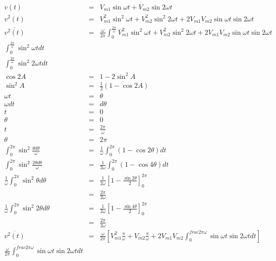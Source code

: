 \documentclass[a4paper,12pt]{article}
\begin{document}
\begin{eqnarray*}
v(t)						& = & V_{m1} \sin{\omega t} + V_{m2} \sin{2 \omega t} \\
v^{2}(t)					& = & V^{2}_{m1} \sin^{2}{\omega t} + V^{2}_{m2} \sin^{2}{2 \omega t} + 2V_{m1}V_{m2} \sin{\omega t}\sin{2 \omega t} \\
\overline{v^{2}(t)}	& = & \frac{\omega}{2 \pi} \int^{\frac{2 \pi}{\omega}}_{0} V^{2}_{m1} \sin^{2}{\omega t} + V^{2}_{m2} \sin^{2}{2\omega t} + 2V_{m1} V_{m2} \sin{\omega t}\sin{2 \omega t} \\
\int^{\frac{2 \pi}{\omega}}_{0} \sin^{2}{\omega t} dt & & \\
\int^{\frac{2 \pi}{\omega}}_{0} \sin^{2}{2 \omega t} dt & & \\
\cos{2A}					& = & 1 - 2 \sin^{2}{A} \\
\sin^{2}{A}				& = & \frac{1}{2} \left( 1 - \cos{2A} \right) \\
\omega t					& = & \theta \\
\omega dt				& = & d \theta \\
t							& = & 0 \\
\theta					& = & 0 \\
t							& = & \frac{2 \pi}{\omega} \\
\theta					& = & 2 \pi \\
\int^{2 \pi}_{0} \sin^{2}{\frac{\theta d \theta}{\omega}} & = & \frac{1}{\omega} \int^{2 \pi}_{0} (1 - \cos{2 \theta}) dt \\ 
\int^{2 \pi}_{0} \sin^{2}{\frac{2 \theta d \theta}{\omega}} & = & \frac{1}{2\omega} \int^{2 \pi}_{0} (1 - \cos{4 \theta}) dt \\
\frac{1}{\omega} \int^{2 \pi}_{0} \sin^{2}{\theta} d\theta & = &
\frac{1}{2 \omega} \left[ 1 - \frac{\sin{2 \theta}}{2} \right]^{2 \pi}_{0} \\
											  & = & \frac{2 \pi}{2 \omega} \\
\frac{1}{\omega} \int^{2 \pi}_{0} \sin^{2}{2 \theta} d\theta & = &
\frac{1}{2 \omega} \left[ 1 - \frac{\sin{4 \theta}}{2} \right]^{2 \pi}_{0} \\
											  & = & \frac{2 \pi}{2 \omega} \\
\overline{v^{2}(t)}					  & = & \frac{\omega}{2 \pi} \left[V_{m1}^{2} \frac{\pi}{\omega} + V_{m2} \frac{\pi}{\omega} + 2 V_{m1}
V_{m2} \int^{frac{2 \pi}{\omega}}_{0} \sin{\omega t}\sin{2\omega t}dt \right] \\
\frac{\omega}{2 \pi} \int^{frac{2 \pi}{\omega}}_{0} \sin{\omega t}\sin{2\omega t}dt & & \\

\end{eqnarray*}
\end{document}
